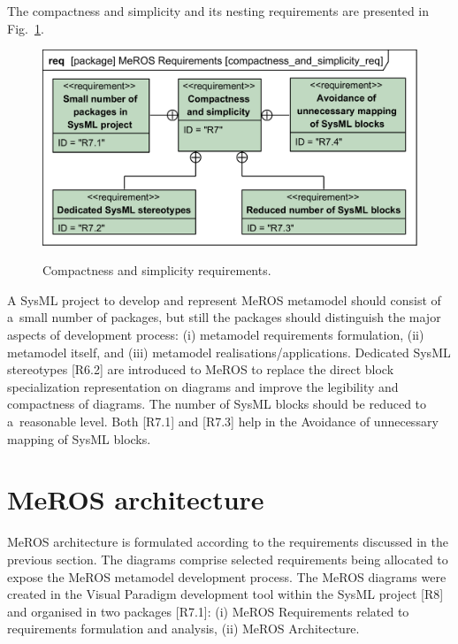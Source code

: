 \documentclass[11pt,oneside,a4paper]{report}
\begin{document}
	The compactness and simplicity and its nesting requirements are presented in Fig.~\ref{fig:compactness_and_simplicity_req}. 
	
	\begin{figure}[H]
		\centering
		\begin{center}
			{\includegraphics[scale=1.0]{diagrams/compactness_and_simplicity_req.png}}
		\end{center}
		\caption{Compactness and simplicity requirements.} 
		\label{fig:compactness_and_simplicity_req}
	\end{figure}
	
	A SysML project to develop and represent MeROS metamodel should consist of a~small number of packages, but still the packages should distinguish the major aspects of development process: (i) metamodel requirements formulation, (ii) metamodel itself, and (iii) metamodel realisations/applications.
	Dedicated SysML stereotypes [R6.2] are introduced to MeROS to replace the direct block specialization representation on diagrams and improve the legibility and compactness of diagrams.
	The number of SysML blocks should be reduced to a~reasonable level. Both [R7.1] and [R7.3] help in the Avoidance of unnecessary mapping of SysML blocks.

	
	
\chapter{MeROS architecture}
\label{ch:architecture}

	MeROS architecture is formulated according to the requirements discussed in the previous section. The diagrams comprise selected requirements being allocated to expose the MeROS metamodel development process. 
	The MeROS diagrams were created in the Visual Paradigm development tool within the SysML project [R8] and organised in two packages [R7.1]: (i) MeROS Requirements related to requirements formulation and analysis, (ii) MeROS Architecture.
		
\end{document}
